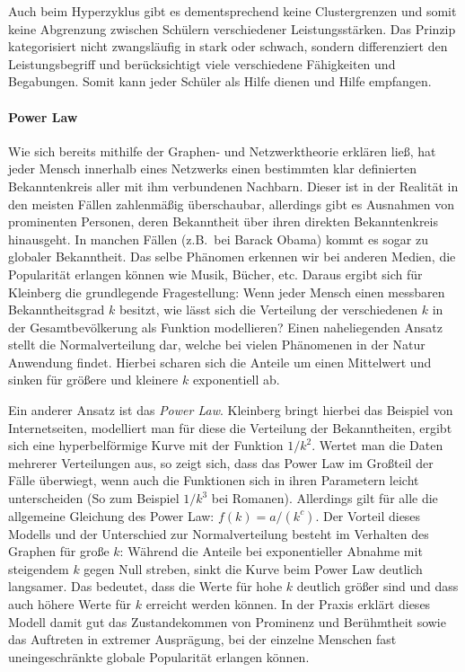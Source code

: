 \begin{enumerate}
	Auch beim Hyperzyklus gibt es dementsprechend keine Clustergrenzen und somit keine Abgrenzung zwischen Schülern verschiedener Leistungsstärken.
	Das Prinzip kategorisiert nicht zwangsläufig in stark oder schwach, sondern differenziert den Leistungsbegriff und berücksichtigt viele verschiedene Fähigkeiten und Begabungen.
	Somit kann jeder Schüler als Hilfe dienen und Hilfe empfangen.
\end{enumerate}


\paragraph{Power Law}

Wie sich bereits mithilfe der Graphen- und Netzwerktheorie erklären ließ, hat jeder Mensch innerhalb eines Netzwerks einen bestimmten klar definierten Bekanntenkreis aller mit ihm verbundenen Nachbarn.
Dieser ist in der Realität in den meisten Fällen zahlenmäßig überschaubar, allerdings gibt es Ausnahmen von prominenten Personen, deren Bekanntheit über ihren direkten Bekanntenkreis hinausgeht.
In manchen Fällen (z.B.\ bei Barack Obama) kommt es sogar zu globaler Bekanntheit.
Das selbe Phänomen erkennen wir bei anderen Medien, die Popularität erlangen können wie Musik, Bücher, etc.
Daraus ergibt sich für Kleinberg die grundlegende Fragestellung:
Wenn jeder Mensch einen messbaren Bekanntheitsgrad $k$ besitzt, wie lässt sich die Verteilung der verschiedenen $k$ in der Gesamtbevölkerung als Funktion modellieren?
Einen naheliegenden Ansatz stellt die Normalverteilung dar, welche bei vielen Phänomenen in der Natur Anwendung findet.
Hierbei scharen sich die Anteile um einen Mittelwert und sinken für größere und kleinere $k$ exponentiell ab.

Ein anderer Ansatz ist das \emph{Power Law}.
Kleinberg bringt hierbei das Beispiel von Internetseiten, modelliert man für diese die Verteilung der Bekanntheiten, ergibt sich eine hyperbelförmige Kurve mit der Funktion $1/ k^2 $.
Wertet man die Daten mehrerer Verteilungen aus, so zeigt sich, dass das Power Law im Großteil der Fälle überwiegt, wenn auch die Funktionen sich in ihren Parametern leicht unterscheiden (So zum Beispiel $1/ k^3$ bei Romanen).
Allerdings gilt für alle die allgemeine Gleichung des Power Law:
$f(k) = a/(k^c)$.
Der Vorteil dieses Modells und der Unterschied zur Normalverteilung besteht im Verhalten des Graphen für große $k$:
Während die Anteile bei exponentieller Abnahme mit steigendem $k$ gegen Null streben, sinkt die Kurve beim Power Law deutlich langsamer.
Das bedeutet, dass die Werte für hohe $k$ deutlich größer sind und dass auch höhere Werte für $k$ erreicht werden können.
In der Praxis erklärt dieses Modell damit gut das Zustandekommen von Prominenz und Berühmtheit sowie das Auftreten in extremer Ausprägung, bei der einzelne Menschen fast uneingeschränkte globale Popularität erlangen können.
